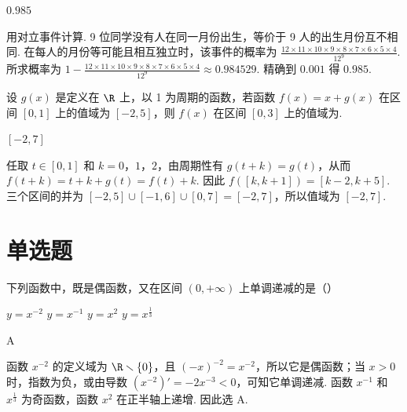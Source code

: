 \begin{answer}
\(0.985\)
\end{answer}

\begin{solution}
用对立事件计算. 9 位同学没有人在同一月份出生，等价于 9 人的出生月份互不相同. 在每人的月份等可能且相互独立时，该事件的概率为
\(\frac{12\times11\times10\times9\times8\times7\times6\times5\times4}{12^9}\). 所求概率为
\(1-\frac{12\times11\times10\times9\times8\times7\times6\times5\times4}{12^9}\approx0.984529\). 精确到 \(0.001\) 得 \(0.985\).
\end{solution}

\begin{problem}
设 \(g(x)\) 是定义在 \(\R\) 上，以 1 为周期的函数，若函数 \(f(x) = x + g(x)\) 在区间 \([0,1]\) 上的值域为 \([-2,5]\)，则 \(f(x)\) 在区间 \([0,3]\) 上的值域为\fillinblank{}.
\end{problem}

\begin{answer}
\([-2,7]\)
\end{answer}

\begin{solution}
任取 \(t\in[0,1]\) 和 \(k=0\)，\(1\)，\(2\)，由周期性有 \(g(t+k)=g(t)\)，从而 \(f(t+k)=t+k+g(t)=f(t)+k\). 因此
\(f([k,k+1])=[k-2,k+5]\). 三个区间的并为 \([-2,5]\cup[-1,6]\cup[0,7]=[-2,7]\)，所以值域为 \([-2,7]\).
\end{solution}

\section{单选题}

\begin{problem}
下列函数中，既是偶函数，又在区间 \((0, +\infty)\) 上单调递减的是（\quad）

\choices
    {\( y = x^{-2} \)}
    {\( y = x^{-1} \)}
    {\( y = x^{2} \)}
    {\( y = x^{\frac{1}{3}} \)}
\end{problem}

\begin{answer}
A
\end{answer}

\begin{solution}
函数 \(x^{-2}\) 的定义域为 \(\R\smallsetminus\{0\}\)，且 \((-x)^{-2}=x^{-2}\)，所以它是偶函数；当 \(x>0\) 时，指数为负，或由导数 \((x^{-2})'=-2x^{-3}<0\)，可知它单调递减. 函数 \(x^{-1}\) 和 \(x^{\frac{1}{3}}\) 为奇函数，函数 \(x^2\) 在正半轴上递增. 因此选 A.
\end{solution}

